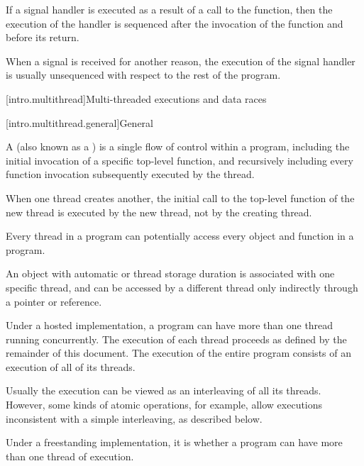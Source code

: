 %
%
\pnum
If a signal handler is executed as a result of a call to the 
function, then the execution of the handler is sequenced after the invocation
of the  function and before its return.
\begin{note}
When a signal is received for another reason, the execution of the
signal handler is usually unsequenced with respect to the rest of the program.
\end{note}

[intro.multithread]{Multi-threaded executions and data races}

[intro.multithread.general]{General}

\pnum
{}%
%
A  (also known as a ) is a single flow of
control within a program, including the initial invocation of a specific
top-level function, and recursively including every function invocation
subsequently executed by the thread.
\begin{note}
When one thread creates another,
the initial call to the top-level function of the new thread is executed by the
new thread, not by the creating thread.
\end{note}
Every thread in a program can
potentially access every object and function in a program.
\begin{footnote}
An object
with automatic or thread storage duration is associated with
one specific thread, and can be accessed by a different thread only indirectly
through a pointer or reference.
\end{footnote}
Under a hosted
implementation, a \Cpp{} program can have more than one thread running
concurrently. The execution of each thread proceeds as defined by the remainder
of this document. The execution of the entire program consists of an execution
of all of its threads.
\begin{note}
Usually the execution can be viewed as an
interleaving of all its threads. However, some kinds of atomic operations, for
example, allow executions inconsistent with a simple interleaving, as described
below.
\end{note}
%
Under a freestanding implementation, it is  whether a program can
have more than one thread of execution.

